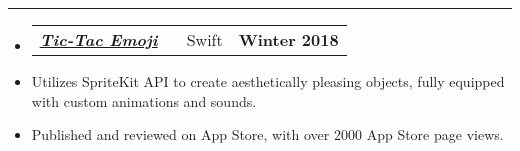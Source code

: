 \documentclass[10pt,letterpaper]{article}
\makeatletter
\newcommand{\header}[2]
{
	\begin{tabular*}{\linewidth}{l @{\extracolsep{\fill}} r}
		#1 & #2 \\
	\end{tabular*}
}
\makeatother
\begin{document}
\hrule

\begin{itemize}
	\item[]
		\header
			{
				\href{https://itunes.apple.com/us/app/tic-tac-emoji/id1346934986?mt=8}{\emph{\underline{\textbf{Tic-Tac Emoji}}}} \ \ \ \footnotesize Swift
				}
				{\textbf{Winter 2018}}
		\item
			Utilizes SpriteKit API to create aesthetically pleasing objects, fully equipped with custom animations and sounds.	
		\item
			Published and reviewed on App Store, with over 2000 App Store page views. 
\end{itemize}
\end{document}
